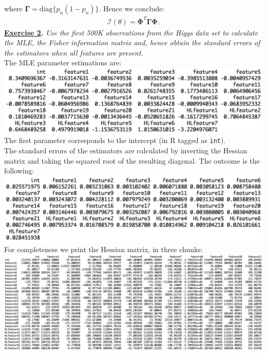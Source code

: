 \documentclass[a4paper, 11pt]{article}
\begin{document}
where $\mathbf{\Gamma} = \text{diag}\{p_n (1 - p_n)\}$. Hence we conclude:
\begin{eqnarray}
\mathcal{I}(\theta) = \mathbf{\Phi}^T \mathbf{\Gamma} \mathbf{\Phi}. \nonumber
\end{eqnarray}
\newpage
\textbf{\underline{Exercise 2}.} \textit{Use the first 500K observations from the Higgs data set to calculate the MLE, the Fisher information matrix and, hence obtain the standard errors of the estimators when all features are present.} \\
\newline The MLE parameter estimations are:\\
\newline \includegraphics[scale=0.7]{w_mle.png}\\
\newline The first parameter corresponds to the intercept (in R tagged as \texttt{int}).\\
\newline The standard errors of the estimators are calculated by inverting the Hessian matrix and taking the squared root of the resulting diagonal. The outcome is the following:\\
\newline \includegraphics[scale=0.7]{se_wmle.png}\\
\newline For completeness we print the Hessian matrix, in three chunks:\\
\newline \includegraphics[scale=0.39]{hessian1.png}\\
\end{document}
